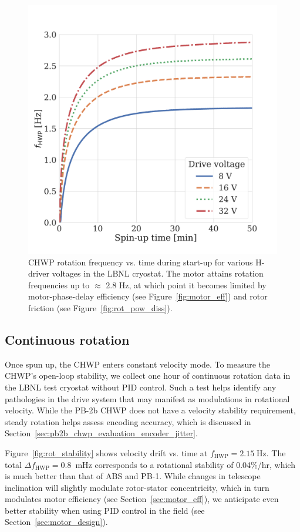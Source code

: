 \begin{figure}[!t]
    \centering
    \includegraphics[width=0.6\linewidth, trim=0.5cm 1.2cm 2.5cm 3cm, clip]{CHWPEvaluation/Figures/rotor_spinup.pdf}
    \caption{CHWP rotation frequency vs. time during start-up for various H-driver voltages in the LBNL cryostat. The motor attains rotation frequencies up to $\approx$ 2.8 Hz, at which point it becomes limited by motor-phase-delay efficiency (see Figure~\ref{fig:motor_eff}) and rotor friction (see Figure~\ref{fig:rot_pow_diss}).}
    \label{fig:spin_up}
\end{figure}


\subsection{Continuous rotation}
\label{sec:pb2a_chwp_evaluation_continuous_rotation}

Once spun up, the CHWP enters constant velocity mode. To measure the CHWP's open-loop stability, we collect one hour of continuous rotation data in the LBNL test cryostat without PID control. Such a test helps identify any pathologies in the drive system that may manifest as modulations in rotational velocity. While the PB-2b CHWP does not have a velocity stability requirement, steady rotation helps assess encoding accuracy, which is discussed in Section~\ref{sec:pb2b_chwp_evaluation_encoder_jitter}.

Figure~\ref{fig:rot_stability} shows velocity drift vs. time at $f_{\mathrm{HWP}} = 2.15 \; \mathrm{Hz}$. The total $\Delta f_{\mathrm{HWP}}= 0.8$~mHz corresponds to a rotational stability of 0.04\%/hr, which is much better than that of ABS \cite{kusaka_modulation_2014} and PB-1. While changes in telescope inclination will slightly modulate rotor-stator concentricity, which in turn modulates motor efficiency (see Section~\ref{sec:motor_eff}), we anticipate even better stability when using PID control in the field (see Section~\ref{sec:motor_design}).

